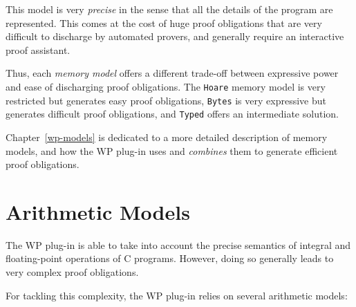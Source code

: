 \begin{description}
  This model is very \emph{precise} in the sense that all the details
  of the program are represented. This comes at the cost of huge proof
  obligations that are very difficult to discharge by automated
  provers, and generally require an interactive proof assistant.

\end{description}

Thus, each \emph{memory model} offers a different trade-off between
expressive power and ease of discharging proof obligations. The
\texttt{Hoare} memory model is very restricted but generates easy proof
obligations, \texttt{Bytes} is very expressive but generates difficult
proof obligations, and \texttt{Typed} offers an intermediate solution.

Chapter~\ref{wp-models} is dedicated to a more detailed description of
memory models, and how the \textsf{WP} plug-in uses and \emph{combines}
them to generate efficient proof obligations.


\section{Arithmetic Models}
\label{wp-model-arith}

The \textsf{WP} plug-in is able to take into account the precise
semantics of integral and floating-point operations of \textsf{C}
programs. However, doing so generally leads to very complex proof obligations.

For tackling this complexity, the \textsf{WP} plug-in relies on several
\textsf{arithmetic} models:

